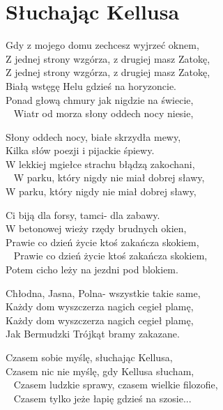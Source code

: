 \section{Słuchając Kellusa}
\begin{text}
Gdy z mojego domu zechcesz wyjrzeć oknem,\\
Z jednej strony wzgórza, z drugiej masz Zatokę,\\
Z jednej strony wzgórza, z drugiej masz Zatokę,\\
Białą wstęgę Helu gdzieś na horyzoncie. \\
Ponad głową chmury jak nigdzie na świecie,\\ 
Wiatr od morza słony oddech nocy niesie, 

Słony oddech nocy, białe skrzydła mewy, \\
Kilka słów poezji i pijackie śpiewy. \\
W lekkiej mgiełce strachu błądzą zakochani,\\ 
W parku, który nigdy nie miał dobrej sławy, \\
W parku, który nigdy nie miał dobrej sławy,

Ci biją dla forsy, tamci- dla zabawy. \\
W betonowej wieży rzędy brudnych okien, \\
Prawie co dzień życie ktoś zakańcza skokiem,\\ 
Prawie co dzień życie ktoś zakańcza skokiem,\\
Potem cicho leży na jezdni pod blokiem. 

Chłodna, Jasna, Polna- wszystkie takie same,\\
Każdy dom wyszczerza nagich cegieł plamę,\\
Każdy dom wyszczerza nagich cegieł plamę,\\
Jak Bermudzki Trójkąt bramy zakazane. 

Czasem sobie myślę, słuchając Kellusa,\\
Czasem nic nie myślę, gdy Kellusa słucham,\\ 
Czasem ludzkie sprawy, czasem wielkie filozofie,\\ 
Czasem tylko jeże łapię gdzieś na szosie...
\end{text}